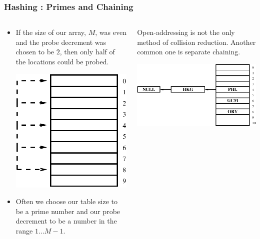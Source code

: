 \begin{frame}[fragile]
\frametitle{Hashing : Primes and Chaining}
\begin{columns}[T]

\begin{column}{0.45\textwidth}
\begin{itemize}[<+->]
\item If the size of our array, $M$, was even and the probe decrement was chosen to be $2$, then only half of the locations could be probed.
\begin{center}
\includegraphics[height=0.4\textheight]{../Images/hashp2.pdf}
\end{center}
\item Often we choose our table size to be a prime number and our probe decrement to be a number in the range $1 \ldots M-1$.
\end{itemize}
\end{column}

\pause
\begin{column}{0.45\textwidth}
Open-addressing is not the only method of collision reduction. Another common
one is separate chaining.
\begin{center}
\includegraphics[width=1.0\textwidth]{../Images/hashsep.pdf}
\end{center}
\end{column}

\end{columns}
\end{frame}


